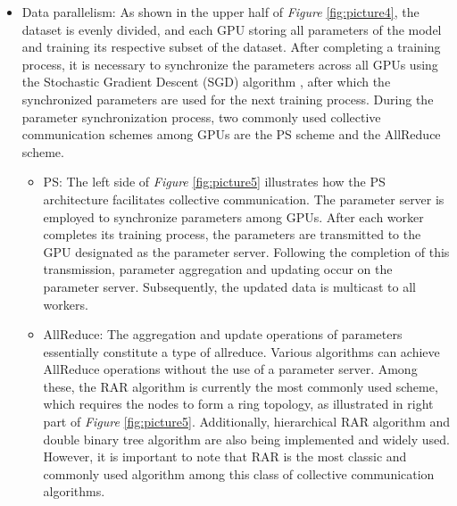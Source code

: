 \documentclass[conference]{IEEEtran}
\begin{document}
\begin{itemize}
	
	\item Data parallelism: As shown in the upper half of \emph{Figure} \ref{fig:picture4}, the dataset is evenly divided, and each GPU storing all parameters of the model and training its respective subset of the dataset. After completing a training process, it is necessary to synchronize the parameters across all GPUs using the Stochastic Gradient Descent (SGD) algorithm \cite{SGD2010}, after which the synchronized parameters are used for the next training process. During the parameter synchronization process, two commonly used collective communication schemes among GPUs are the PS scheme and the AllReduce scheme.
	
	\begin{itemize}
		
		\item PS: The left side of \emph{Figure} \ref{fig:picture5} illustrates how the PS architecture facilitates collective communication. The parameter server is employed to synchronize parameters among GPUs. After each worker completes its training process, the parameters are transmitted to the GPU designated as the parameter server. Following the completion of this transmission, parameter aggregation and updating occur on the parameter server. Subsequently, the updated data is multicast to all workers.
		
		
		\item AllReduce: The aggregation and update operations of parameters essentially constitute a type of allreduce. Various algorithms can achieve AllReduce operations without the use of a parameter server. Among these, the RAR algorithm is currently the most commonly used scheme, which requires the nodes to form a ring topology, as illustrated in right part of \emph{Figure} \ref{fig:picture5}. Additionally,  hierarchical RAR algorithm and double binary tree algorithm \cite{Tree} are also being implemented and widely used. However, it is important to note that RAR is the most classic and commonly used algorithm among this class of collective communication algorithms.
	\end{itemize}
	

\end{itemize}
\end{document}
